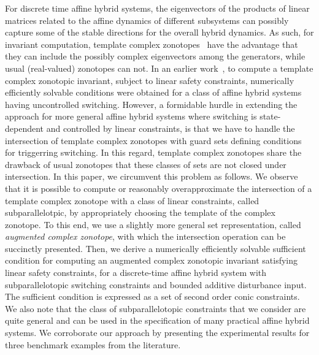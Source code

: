

For discrete time affine hybrid systems, the eigenvectors of the
products of linear matrices related to the affine dynamics of
different subsystems can possibly capture some of the stable
directions for the overall hybrid dynamics.  As such, for invariant
computation, template complex zonotopes~\cite{tcz2017} have the advantage that they
can include the possibly complex eigenvectors among the generators,
while usual (real-valued) zonotopes can not. In an earlier
work~\cite{tcz2017}, to compute a template complex zonotopic invariant, subject to linear
safety constraints, numerically efficiently solvable conditions were obtained for a class of affine hybrid
systems having uncontrolled switching. However, a formidable
hurdle in extending the approach for more general affine hybrid
systems where switching is state-dependent and controlled by linear constraints, is that
we have to handle the intersection of template complex zonotopes with
guard sets defining conditions for triggerring switching. In this regard, template complex zonotopes
share the drawback of usual zonotopes that these classes of sets are
not closed under intersection. In this paper, we circumvent this problem as follows. We observe that
it is possible to compute or reasonably overapproximate the
intersection of a template complex zonotope with a class of linear
constraints, called subparallelotpic, by appropriately choosing the
template of the complex zonotope.  To this end, we use a slightly more general set
representation, called \emph{augmented complex zonotope}, with which the
intersection operation can be succinctly presented.  %
Then, we derive a numerically efficiently solvable
sufficient condition for computing an augmented complex zonotopic
invariant satisfying linear safety constraints, for a discrete-time
affine hybrid system with subparallelotopic switching constraints and
bounded additive disturbance input.  The sufficient condition is
expressed as a set of second order conic constraints.  We also note
that the class of subparallelotopic constraints that we consider are
quite general and can be used in the specification of many practical 
affine hybrid systems. We corroborate our approach by presenting the
experimental results for three benchmark examples from the literature.\\

